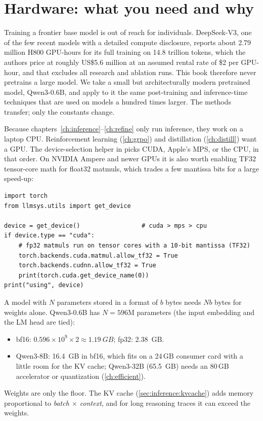 \section{Hardware: what you need and why}\label{sec:inference:hardware}

Training a frontier base model is out of reach for individuals. DeepSeek-V3, one of the few
recent models with a detailed compute disclosure, reports about 2.79 million H800 GPU-hours for its
full training on 14.8 trillion tokens, which the authors price at roughly US\$5.6 million at an
assumed rental rate of \$2 per GPU-hour, and that excludes all research and ablation runs.
This book therefore never pretrains a large model. We take a small but architecturally modern
pretrained model, Qwen3-0.6B, and apply to it the same post-training and inference-time
techniques that are used on models a hundred times larger. The methods transfer; only the
constants change.

Because chapters~\ref{ch:inference}--\ref{ch:refine} only run inference, they work on a laptop
CPU. Reinforcement learning (\cref{ch:grpo}) and distillation (\cref{ch:distill}) want a GPU.
The device-selection helper in  picks CUDA, Apple's MPS, or the CPU,
in that order. On NVIDIA Ampere and newer GPUs it is also worth enabling TF32 tensor-core math
for float32 matmuls, which trades a few mantissa bits for a large speed-up:

\begin{lstlisting}[caption={Device selection and TF32.},label={lst:inference:device}]
import torch
from llmsys.utils import get_device

device = get_device()                 # cuda > mps > cpu
if device.type == "cuda":
    # fp32 matmuls run on tensor cores with a 10-bit mantissa (TF32)
    torch.backends.cuda.matmul.allow_tf32 = True
    torch.backends.cudnn.allow_tf32 = True
    print(torch.cuda.get_device_name(0))
print("using", device)
\end{lstlisting}

\begin{napkinmath}
A model with $N$ parameters stored in a format of $b$ bytes needs $Nb$ bytes for weights alone.
Qwen3-0.6B has $N=\num{596}$M parameters (the input embedding and the LM head are tied):
\begin{itemize}
  \item bf16: $0.596\times10^9 \times 2 \approx \SI{1.19}{GB}$; fp32: \SI{2.38}{GB}.
  \item Qwen3-8B: \SI{16.4}{GB} in bf16, which fits on a 24\,GB consumer card with a little room for the
    KV cache; Qwen3-32B (\SI{65.5}{GB}) needs an 80\,GB accelerator or quantization (\cref{ch:efficient}).
\end{itemize}
Weights are only the floor. The KV cache (\cref{sec:inference:kvcache}) adds memory proportional to
\emph{batch $\times$ context}, and for long reasoning traces it can exceed the weights.
\end{napkinmath}

